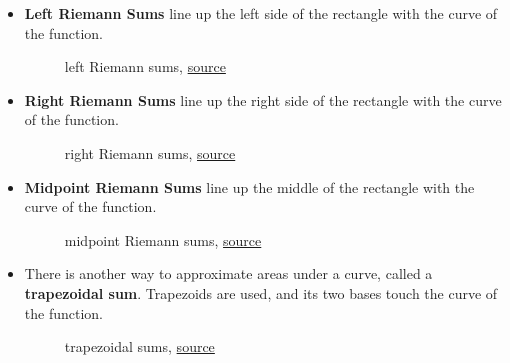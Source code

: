 \documentclass[12pt]{article}
\begin{document}
\begin{itemize}
    \item \textbf{Left Riemann Sums} line up the left side of the rectangle with the curve of the function.
          \begin{figure}[H]
              \begin{center}
                  \caption{left Riemann sums, \href{https://www.khanacademy.org/math/ap-calculus-bc/bc-integration-new/bc-6-2/a/riemann-sums-review?modal=1}{source}}
              \end{center}
          \end{figure}

    \item \textbf{Right Riemann Sums} line up the right side of the rectangle with the curve of the function.
          \begin{figure}[H]
              \begin{center}
                  \caption{right Riemann sums, \href{https://www.khanacademy.org/math/ap-calculus-bc/bc-integration-new/bc-6-2/a/riemann-sums-review?modal=1}{source}}
              \end{center}
          \end{figure}

    \item \textbf{Midpoint Riemann Sums} line up the middle of the rectangle with the curve of the function.
          \begin{figure}[H]
              \begin{center}
                  \caption{midpoint Riemann sums, \href{https://www.khanacademy.org/math/ap-calculus-bc/bc-integration-new/bc-6-2/a/riemann-sums-review?modal=1}{source}}
              \end{center}
          \end{figure}

    \item There is another way to approximate areas under a curve, called a \textbf{trapezoidal sum}. Trapezoids are used, and its two bases touch the curve of the function.
          \begin{figure}[H]
              \begin{center}
                  \caption{trapezoidal sums, \href{https://www.khanacademy.org/math/ap-calculus-bc/bc-integration-new/bc-6-2/a/riemann-sums-review?modal=1}{source}}
              \end{center}
          \end{figure}
\end{itemize}
\end{document}
